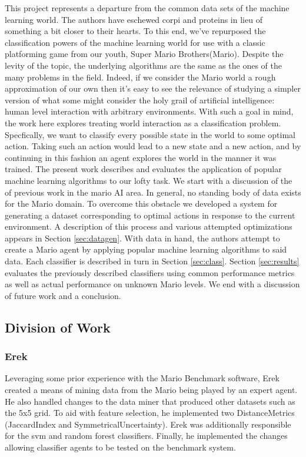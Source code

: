 \documentclass[]{article}   %
\begin{document}
This project represents a departure from the common data sets of the machine learning world. The authors have eschewed corpi and proteins in lieu of something a bit closer to their hearts.  To this end, we've repurposed the classification powers of the machine learning world for use with a classic platforming game from our youth, Super Mario Brothers(Mario).  Despite the levity of the topic, the underlying algorithms are the same as the ones of the  many problems in the field.  Indeed, if we consider the Mario world a rough approximation of our own then it's easy to see the relevance of studying a simpler version of what some might consider the holy grail of artificial intelligence: human level interaction with arbitrary environments.
\newline\newline
With such a goal in mind, the work here explores treating world interaction as a classification problem.  Specfically, we want to classify every possible state in the world to some optimal action. Taking such an action would lead to a new state and a new action, and by continuing in this fashion an agent explores the world in the manner it was trained.
\newline\newline
The present work describes and evaluates the application of popular machine learning algorithms to our lofty task.  We start with a discussion of the of previous work in the mario AI area.  In general, no standing body of data exists for the Mario domain.  To overcome this obstacle we developed a system for generating a dataset corresponding to optimal actions in response to the current environment.  A description of this process and various attempted optimizations appears in Section \ref{sec:datagen}.  With data in hand, the authors attempt to create a Mario agent by applying popular machine learning algorithms to said data.  Each classifier is described in turn in Section \ref{sec:class}.  Section \ref{sec:results} evaluates the previously described classifiers using common performance metrics as well as actual performance on unknown Mario levels.  We end with a discussion of future work and a conclusion.

\subsection{Division of Work}

\subsubsection{Erek}
Leveraging some prior experience with the Mario Benchmark software, Erek created a means of mining data from the Mario being played by an expert agent. He also handled changes to the data miner that produced other datasets such as the 5x5 grid. To aid with feature selection, he implemented two DistanceMetrics (JaccardIndex and SymmetricalUncertainty). Erek was additionally responsible for the svm and random forest classifiers. Finally, he implemented the changes allowing classifier agents to be tested on the benchmark system.
\end{document}
